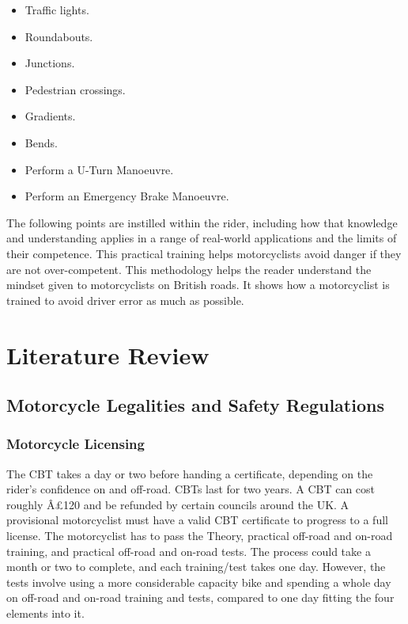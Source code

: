 \documentclass[12pt]{report} %
\begin{document}
		\begin{itemize}
			\item Traffic lights.
			\item Roundabouts.
			\item Junctions.
			\item Pedestrian crossings.
			\item Gradients.
			\item Bends.
		\item Perform a U-Turn Manoeuvre.
		\item Perform an Emergency Brake Manoeuvre.
		\end{itemize}

	The following points are instilled within the rider, including how that knowledge and understanding applies in a range of real-world applications and the limits of their competence. This practical training helps motorcyclists avoid danger if they are not over-competent. This methodology helps the reader understand the mindset given to motorcyclists on British roads. It shows how a motorcyclist is trained to avoid driver error as much as possible.

\chapter{Literature Review}
\label{chap:literatureReview}
	\section{Motorcycle Legalities and Safety Regulations}
	\label{sec:lrMotorcycleLegalitiesSafetyRegulations}
		\subsection*{Motorcycle Licensing}
			The CBT takes a day or two before handing a certificate, depending on the rider's confidence on and off-road. CBTs last for two years. A CBT can cost roughly Â£120 and be refunded by certain councils around the UK. A provisional motorcyclist must have a valid CBT certificate to progress to a full license. The motorcyclist has to pass the Theory, practical off-road and on-road training, and practical off-road and on-road tests. The process could take a month or two to complete, and each training/test takes one day. However, the tests involve using a more considerable capacity bike and spending a whole day on off-road and on-road training and tests, compared to one day fitting the four elements into it. 
\end{document}
